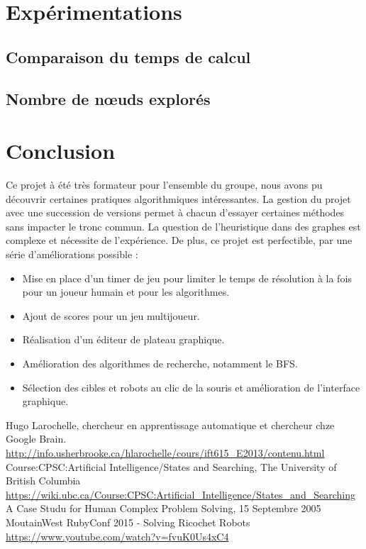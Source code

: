 \documentclass[a4paper]{article} %
\begin{document}
\section{Expérimentations}
	\subsection{Comparaison du temps de calcul}
	\subsection{Nombre de nœuds explorés}


\section{Conclusion}
Ce projet à été très formateur pour l'ensemble du groupe, nous avons pu découvrir certaines pratiques algorithmiques intéressantes. La gestion du projet avec une succession de versions permet à chacun d'essayer certaines méthodes sans impacter le tronc commun. La question de l'heuristique dans des graphes est complexe et nécessite de l'expérience. De plus, ce projet est perfectible, par une série d'améliorations possible :
\begin{itemize}
\item Mise en place d'un timer de jeu pour limiter le temps de résolution à la fois pour un joueur humain et pour les algorithmes.
\item Ajout de scores pour un jeu multijoueur.
\item Réalisation d'un éditeur de plateau graphique.
\item Amélioration des algorithmes de recherche, notamment le BFS.
\item Sélection des cibles et robots au clic de la souris et amélioration de l'interface graphique.
\end{itemize}

\begin{thebibliography}{9}
 Hugo Larochelle, chercheur en apprentissage automatique et chercheur chze Google Brain. \url{http://info.usherbrooke.ca/hlarochelle/cours/ift615_E2013/contenu.html}
 Course:CPSC:Artificial Intelligence/States and Searching, The University of British Columbia \url{https://wiki.ubc.ca/Course:CPSC:Artificial_Intelligence/States_and_Searching}
 A Case Studu for Human Complex Problem Solving, 15 Septembre 2005
 MoutainWest RubyConf 2015 - Solving Ricochet Robots \url{https://www.youtube.com/watch?v=fvuK0Us4xC4}
\end{thebibliography}
\end{document}
